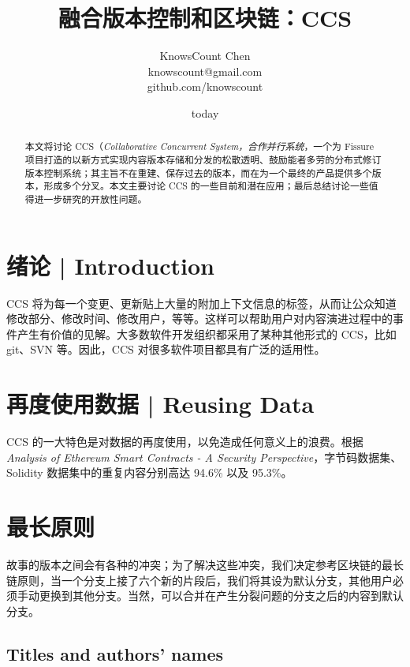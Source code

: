 \documentclass{cnle}
\title[Version Control, Blockchain, and CCS]
      {融合版本控制和区块链：CCS}
\author[KnowsCount]
       {KnowsCount Chen\\
        knowscount@gmail.com\\
        github.com/knowscount}
\date{today}
\begin{document}
\label{firstpage}
\maketitle

\begin{abstract}
本文将讨论 CCS（{\em Collaborative Concurrent System，合作并行系统\/}，一个为 Fissure 项目打造的以新方式实现内容版本存储和分发的松散透明、鼓励能者多劳的分布式修订版本控制系统；其主旨不在重建、保存过去的版本，而在为一个最终的产品提供多个版本，形成多个分叉。本文主要讨论 CCS 的一些目前和潜在应用；最后总结讨论一些值得进一步研究的开放性问题。
\end{abstract}

\section{绪论 | Introduction}

CCS 将为每一个变更、更新贴上大量的附加上下文信息的标签，从而让公众知道修改部分、修改时间、修改用户，等等。这样可以帮助用户对内容演进过程中的事件产生有价值的见解。大多数软件开发组织都采用了某种其他形式的 CCS，比如 git、SVN 等。因此，CCS 对很多软件项目都具有广泛的适用性。

\section{再度使用数据 | Reusing Data}

CCS 的一大特色是对数据的再度使用，以免造成任何意义上的浪费。根据 {\em Analysis of Ethereum Smart Contracts - A Security Perspective\/}，字节码数据集、Solidity 数据集中的重复内容分别高达 94.6\% 以及 95.3\%。



\section{最长原则}

故事的版本之间会有各种的冲突；为了解决这些冲突，我们决定参考区块链的最长链原则，当一个分支上接了六个新的片段后，我们将其设为默认分支，其他用户必须手动更换到其他分支。当然，可以合并在产生分裂问题的分支之后的内容到默认分支。

\subsection{Titles and authors' names}
\end{document}
